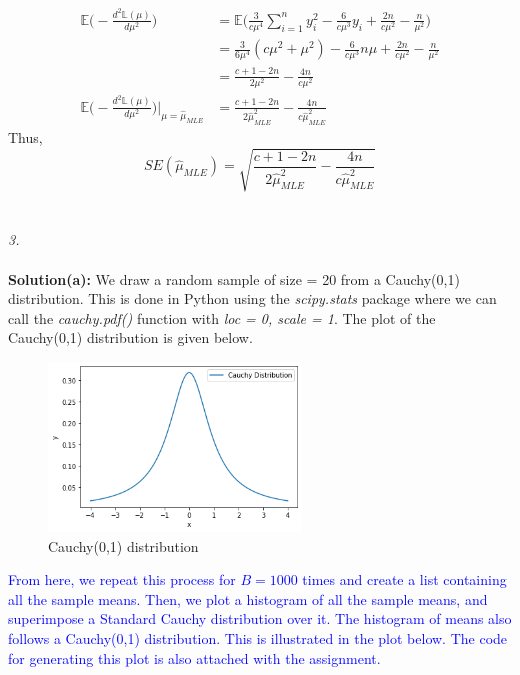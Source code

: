 \documentclass[11pt]{article}
\begin{document}
{\begin{equation}
  \nonumber
  \begin{aligned}
    \mathbb{E}\bigg(-\frac{d^2 \mathbb{L}(\mu)}{d \mu^2}\bigg) & = \mathbb{E}\bigg(\frac{3}{c\mu^4}\sum_{i=1}^ny_i^2 - \frac{6}{c\mu^3}y_i + \frac{2n}{c\mu^2} - \frac{n}{\mu^2}\bigg)\\
    &=\frac{3}{6\mu^4}(c\mu^2+\mu^2) - \frac{6}{c\mu^3}n\mu + \frac{2n}{c\mu^2} - \frac{n}{\mu^2}\\
    &=\frac{c+1-2n}{2\mu^2} - \frac{4n}{c\mu^2}\\
    \mathbb{E}\bigg(-\frac{d^2 \mathbb{L}(\mu)}{d \mu^2}\bigg) \bigg\lvert_{\mu = \hat{\mu}_{MLE}} & = \frac{c+1-2n}{2\hat{\mu}_{MLE}^2} - \frac{4n}{c\hat{\mu}_{MLE}^2}
  \end{aligned}
\end{equation}
Thus,
\begin{equation}
  \nonumber
  SE(\hat{\mu}_{MLE}) = \sqrt{\frac{c+1-2n}{2\hat{\mu}_{MLE}^2} - \frac{4n}{c\hat{\mu}_{MLE}^2}}
\end{equation}
}\\ \\
\noindent \emph{3.} \\ \\
\textbf{Solution(a):}
We draw a random sample of size = 20 from a Cauchy(0,1) distribution. This is done in Python using the \emph{scipy.stats} package where we can call the \emph{cauchy.pdf()} function with \emph{loc = 0, scale = 1}. The plot of the Cauchy(0,1) distribution is given below.
\begin{figure}[H]
  \centering
  \includegraphics[width = 0.6\textwidth]{q3a.png}
  \caption{Cauchy(0,1) distribution}
\end{figure}
\noindent \textcolor{blue}{From here, we repeat this process for $B = 1000$ times and create a list containing all the sample means. Then, we plot a histogram of all the sample means, and superimpose a Standard Cauchy distribution over it. The histogram of means also follows a Cauchy(0,1) distribution. This is illustrated in the plot below. The code for generating this plot is also attached with the assignment.}
\end{document}
